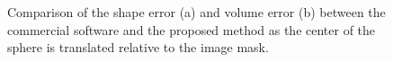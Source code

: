 \begin{figure}[ht!]
	\centering
	\caption{Comparison of the shape error (a) and volume error (b) between the commercial software and the proposed method as the center of the sphere is translated relative to the image mask.}
    \label{fig:graph3}
\end{figure}
